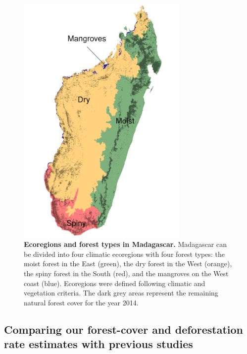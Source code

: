 \documentclass[essd, classical]{copernicus}
\begin{document}
\begin{figure}[h]
  \centering
    
    \includegraphics[width=8.3cm]{ecoregion.png}
    
    \caption{\textbf{Ecoregions and forest types in Madagascar.}
      Madagascar can be divided into four climatic ecoregions with four forest
      types: the moist forest in the East (green), the dry forest in the West
      (orange), the spiny forest in the South (red), and the mangroves on the
      West coast (blue). Ecoregions were defined following climatic
      \citep{Cornet1974} and vegetation \citep{IEFN1996} criteria. The dark
      grey areas represent the remaining natural forest cover for the year
      2014.}

    \label{fig:ecoregion}
    
\end{figure}

\subsection{Comparing our forest-cover and deforestation rate
estimates with previous studies}
\end{document}
